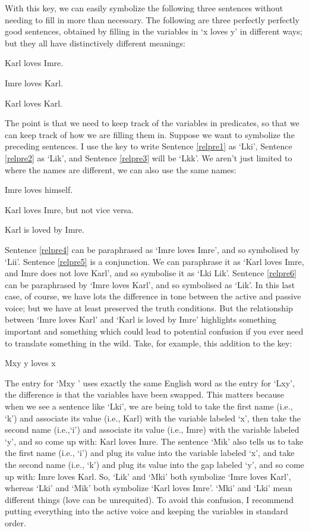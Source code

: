 With this key, we can easily symbolize the following three sentences without needing to fill in more than necessary. The following are three perfectly perfectly good sentences, obtained by filling in the variables in ‘x loves y’ in different ways; but they all have distinctively different meanings:
\begin{earg}
\item[\ex{relpre1}] Karl loves Imre.
\item[\ex{relpre2}] Imre loves Karl.
\item[\ex{relpre3}] Karl loves Karl.
\end{earg}
The point is that we need to keep track of the variables in predicates, so that we can keep track of how we are filling them in. Suppose we want to symbolize the preceding sentences. I use the key to write Sentence \ref{relpre1} as ‘Lki', Sentence \ref{relpre2} as ‘Lik’, and Sentence \ref{relpre3} will be ‘Lkk’. We aren't just limited to where the names are different, we can also use the same names:
\begin{earg}
\item[\ex{relpre4}]Imre loves himself.
\item[\ex{relpre5}]Karl loves Imre, but not vice versa.
\item[\ex{relpre6}]Karl is loved by Imre.
\end{earg}
Sentence \ref{relpre4} can be paraphrased as ‘Imre loves Imre’, and so symbolised by ‘Lii’. Sentence \ref{relpre5} is a conjunction. We can paraphrase it as ‘Karl loves Imre, and Imre does not love Karl’, and so symbolise it as ‘Lki \eand  \enot Lik’. Sentence \ref{relpre6} can be paraphrased by ‘Imre loves Karl’, and so symbolised as ‘Lik’. In this last case, of course, we have lots the difference in tone between the active and passive voice; but we have at least preserved the truth conditions. But the relationship between ‘Imre loves Karl’ and ‘Karl is loved by Imre’ highlights something important and something which could lead to potential confusion if you ever need to translate something in the wild. Take, for example, this addition to the key:
\begin{ekey}
\item[Mxy] y loves x
\end{ekey}
The entry for ‘Mxy ’ uses exactly the same English word as the entry for ‘Lxy’, the difference is that the variables have been swapped. This matters because when we see a sentence like ‘Lki’, we are being told to take the first name (i.e., ‘k’) and associate its value (i.e., Karl) with the variable labeled ‘x’, then take the second name (i.e.,‘i’) and associate its value (i.e., Imre) with the variable labeled ‘y’, and so come up with: Karl loves Imre. The sentence ‘Mik’ also tells us to take the first name (i.e., ‘i’) and plug its value into the variable labeled ‘x’, and take the second name (i.e., ‘k’) and plug its value into the gap labeled ‘y’, and so come up with: Imre loves Karl. So, ‘Lik’ and ‘Mki’ both symbolize ‘Imre loves Karl’, whereas ‘Lki’ and ‘Mik’ both symbolize ‘Karl loves Imre’. ‘Mki' and ‘Lki' mean different things (love can be unrequited). To avoid this confusion, I recommend putting everything into the active voice and keeping the variables in standard order. 

